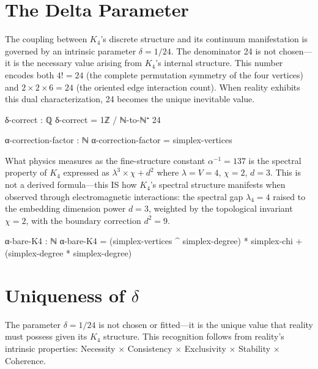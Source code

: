 \documentclass[11pt,a4paper]{book}
\begin{document}
\section{The Delta Parameter}

The coupling between $K_4$'s discrete structure and its continuum manifestation is governed by an intrinsic parameter $\delta = 1/24$. The denominator 24 is not chosen—it is the necessary value arising from $K_4$'s internal structure. This number encodes both $4! = 24$ (the complete permutation symmetry of the four vertices) and $2 \times 2 \times 6 = 24$ (the oriented edge interaction count). When reality exhibits this dual characterization, 24 becomes the unique inevitable value.

\begin{code}
δ-correct : ℚ
δ-correct = 1ℤ / ℕ-to-ℕ⁺ 24

α-correction-factor : ℕ
α-correction-factor = simplex-vertices
\end{code}

What physics measures as the fine-structure constant $\alpha^{-1} = 137$ is the spectral property of $K_4$ expressed as $\lambda^3 \times \chi + d^2$ where $\lambda = V = 4$, $\chi = 2$, $d = 3$. This is not a derived formula—this IS how $K_4$'s spectral structure manifests when observed through electromagnetic interactions: the spectral gap $\lambda_4 = 4$ raised to the embedding dimension power $d = 3$, weighted by the topological invariant $\chi = 2$, with the boundary correction $d^2 = 9$.

\begin{code}
α-bare-K4 : ℕ
α-bare-K4 = (simplex-vertices ^ simplex-degree) * simplex-chi + (simplex-degree * simplex-degree)
\end{code}

\section{Uniqueness of \texorpdfstring{$\delta$}{delta}}

The parameter $\delta = 1/24$ is not chosen or fitted—it is the unique value that reality must possess given its $K_4$ structure. This recognition follows from reality's intrinsic properties: Necessity $\times$ Consistency $\times$ Exclusivity $\times$ Stability $\times$ Coherence.
\end{document}
